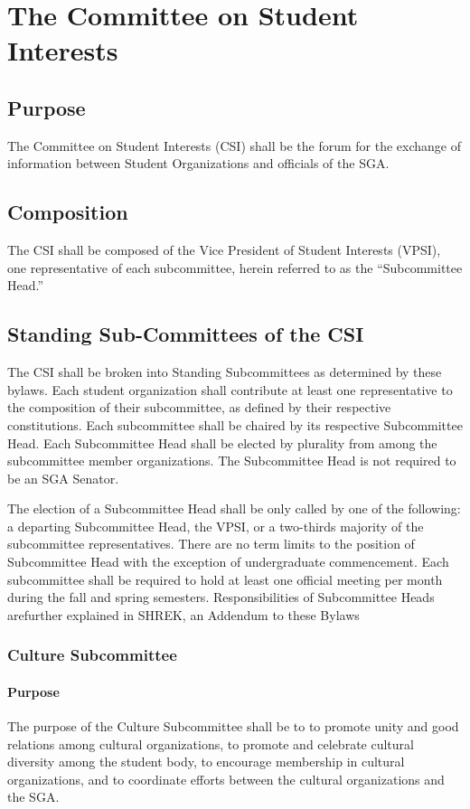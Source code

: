 \documentclass[12pt]{scrreprt}
\begin{document}
\section{The Committee on Student Interests} \label{sec:csi_representative}

\subsection{Purpose}
The Committee on Student Interests (CSI) shall be the forum for the exchange of
information between Student Organizations and officials of the SGA.

\subsection{Composition}
The CSI shall be composed of the Vice President of Student Interests (VPSI), one
representative of each subcommittee, herein referred to as the “Subcommittee Head.”

\subsection{Standing Sub-Committees of the CSI} \label{sec:csi_subcommittees}
The CSI shall be broken into Standing Subcommittees as determined by these bylaws. Each
student organization shall contribute at least one representative to the composition of their
subcommittee, as defined by their respective constitutions. Each subcommittee shall be
chaired by its respective Subcommittee Head. Each Subcommittee Head shall be elected by
plurality from among the subcommittee member organizations. The Subcommittee Head is
not required to be an SGA Senator.


The election of a Subcommittee Head shall be only called by one of the following: a departing Subcommittee Head, the VPSI, or a two-thirds majority of the subcommittee representatives. There are no term limits to the position of Subcommittee Head with the
exception of undergraduate commencement. Each subcommittee shall be required to hold at least one official meeting per month during
the fall and spring semesters. Responsibilities of Subcommittee Heads arefurther explained in SHREK, an Addendum to these Bylaws

\subsubsection{Culture Subcommittee}

\paragraph{Purpose}
The purpose of the Culture Subcommittee shall be to to promote unity and good relations among cultural organizations, to promote and celebrate cultural diversity
among the student body, to encourage membership in cultural organizations, and to coordinate efforts between the cultural organizations and the SGA.
\end{document}
